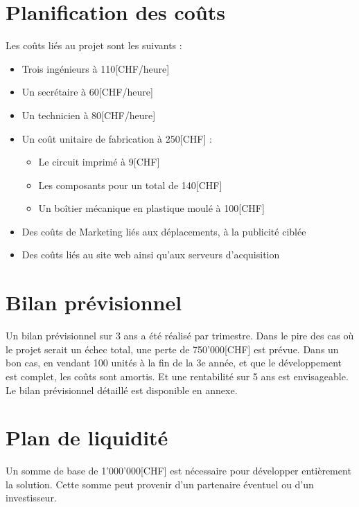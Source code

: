 \section{Planification des coûts}
Les coûts liés au projet sont les suivants :
\begin{itemize}
    \item Trois ingénieurs à 110[CHF/heure]
    \item Un secrétaire à 60[CHF/heure]
    \item Un technicien à 80[CHF/heure]
    \item Un coût unitaire de fabrication à 250[CHF] :
    \begin{itemize}
        \item Le circuit imprimé à 9[CHF]
        \item Les composants pour un total de 140[CHF]
        \item Un boîtier mécanique en plastique moulé à 100[CHF]
    \end{itemize}
    \item Des coûts de Marketing liés aux déplacements, à la publicité ciblée
    \item Des coûts liés au site web ainsi qu'aux serveurs d'acquisition
\end{itemize}

\section{Bilan prévisionnel}
Un bilan prévisionnel sur 3 ans a été réalisé par trimestre.
Dans le pire des cas où le projet serait un échec total,
une perte de 750'000[CHF] est prévue.
Dans un bon cas, en vendant 100 unités à la fin de la 3e année,
et que le développement est complet, les coûts sont amortis. Et une
rentabilité sur 5 ans est envisageable.
Le bilan prévisionnel détaillé est disponible en annexe.

\section{Plan de liquidité}
Un somme de base de 1'000'000[CHF] est nécessaire pour développer
entièrement la solution. Cette somme peut provenir d'un partenaire
éventuel ou d'un investisseur.